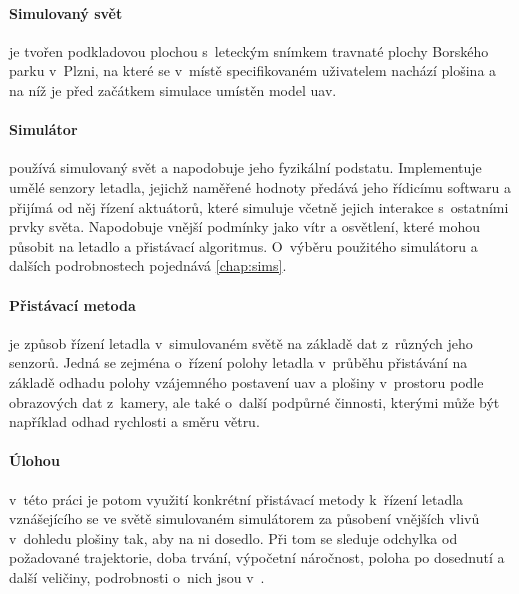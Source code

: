 \paragraph{Simulovaný svět} je tvořen podkladovou plochou s~leteckým snímkem travnaté plochy Borského parku v~Plzni, na které se v~místě specifikovaném uživatelem nachází plošina a na níž je před začátkem simulace umístěn model \acrshort{uav}.

\paragraph{Simulátor} používá simulovaný svět a napodobuje jeho fyzikální podstatu. Implementuje umělé senzory letadla, jejichž naměřené hodnoty předává jeho řídicímu softwaru a přijímá od něj řízení aktuátorů, které simuluje včetně jejich interakce s~ostatními prvky světa. Napodobuje vnější podmínky jako vítr a osvětlení, které mohou působit na letadlo a přistávací algoritmus. O~výběru použitého simulátoru a dalších podrobnostech pojednává \cref{chap:sims}.

\paragraph{Přistávací metoda} je způsob řízení letadla v~simulovaném světě na základě dat z~různých jeho senzorů. Jedná se zejména o~řízení polohy letadla v~průběhu přistávání na základě odhadu polohy vzájemného postavení \acrshort{uav} a plošiny v~prostoru podle obrazových dat z~kamery, ale také o~další podpůrné činnosti, kterými může být například odhad rychlosti a směru větru.

\paragraph{Úlohou} v~této práci je potom využití konkrétní přistávací metody k~řízení letadla vznášejícího se ve světě simulovaném simulátorem za působení vnějších vlivů v~dohledu plošiny tak, aby na ni dosedlo. Při tom se sleduje odchylka od požadované trajektorie, doba trvání, výpočetní náročnost, poloha po dosednutí a další veličiny, podrobnosti o~nich jsou v~.
